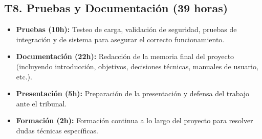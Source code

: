 \subsection*{T8. Pruebas y Documentación (39 horas)}
\begin{itemize}
    \item \textbf{Pruebas (10h):} Testeo de carga, validación de seguridad, pruebas de integración y de sistema para asegurar el correcto funcionamiento.
    \item \textbf{Documentación (22h):} Redacción de la memoria final del proyecto (incluyendo introducción, objetivos, decisiones técnicas, manuales de usuario, etc.).
    \item \textbf{Presentación (5h):} Preparación de la presentación y defensa del trabajo ante el tribunal.
    \item \textbf{Formación (2h):} Formación continua a lo largo del proyecto para resolver dudas técnicas específicas.
\end{itemize}



